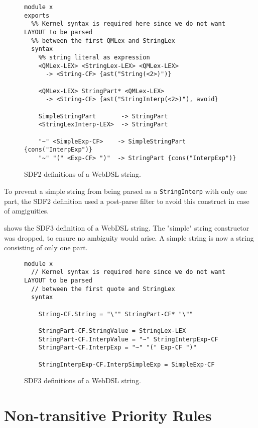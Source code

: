       \begin{figure}
        \begin{verbatim}
module x
exports
  %% Kernel syntax is required here since we do not want LAYOUT to be parsed
  %% between the first QMLex and StringLex
  syntax
    %% string literal as expression
    <QMLex-LEX> <StringLex-LEX> <QMLex-LEX>
      -> <String-CF> {ast("String(<2>)")}

    <QMLex-LEX> StringPart* <QMLex-LEX>
      -> <String-CF> {ast("StringInterp(<2>)"), avoid}

    SimpleStringPart       -> StringPart
    <StringLexInterp-LEX>  -> StringPart

    "~" <SimpleExp-CF>    -> SimpleStringPart {cons("InterpExp")}
    "~" "(" <Exp-CF> ")"  -> StringPart {cons("InterpExp")}
        \end{verbatim}
        \caption{\label{fig:sdf2-webdsl-string}SDF2 definitions of a WebDSL string.}
      \end{figure}

      To prevent a simple string from being parsed as a \texttt{StringInterp} with only one part, the SDF2 definition used a post-parse filter to avoid this construct in case of amgiguities.
      
       shows the SDF3 definition of a WebDSL string. The "simple" string constructor was dropped, to ensure no ambiguity would arise. A simple string is now a string consisting of only one part.

      \begin{figure}
        \begin{verbatim}
module x
  // Kernel syntax is required here since we do not want LAYOUT to be parsed
  // between the first quote and StringLex
  syntax

    String-CF.String = "\"" StringPart-CF* "\""

    StringPart-CF.StringValue = StringLex-LEX
    StringPart-CF.InterpValue = "~" StringInterpExp-CF
    StringPart-CF.InterpExp = "~" "(" Exp-CF ")"

    StringInterpExp-CF.InterpSimpleExp = SimpleExp-CF
        \end{verbatim}
        \caption{\label{fig:sdf3-webdsl-string}SDF3 definitions of a WebDSL string.}
      \end{figure}

    \section{Non-transitive Priority Rules}

